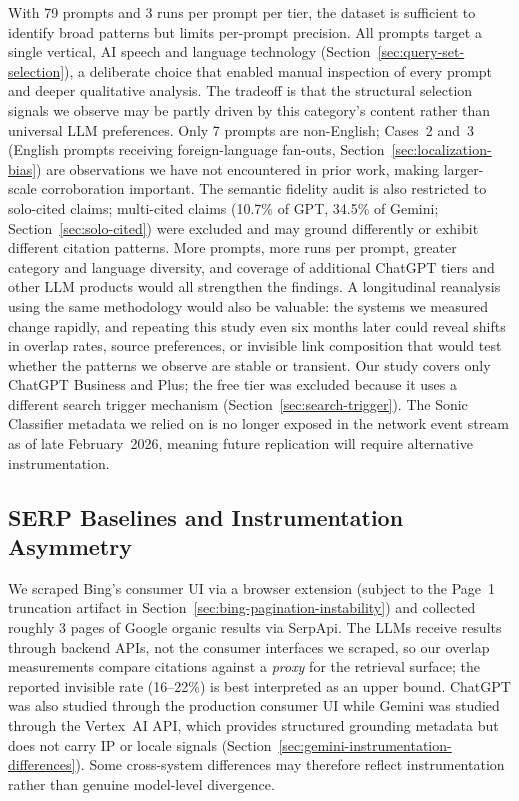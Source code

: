 With 79 prompts and 3 runs per prompt per tier, the dataset is sufficient to identify broad patterns but limits per-prompt precision. All prompts target a single vertical, AI speech and language technology (Section~\ref{sec:query-set-selection}), a deliberate choice that enabled manual inspection of every prompt and deeper qualitative analysis. The tradeoff is that the structural selection signals we observe may be partly driven by this category's content rather than universal LLM preferences. Only 7 prompts are non-English; Cases~2 and~3 (English prompts receiving foreign-language fan-outs, Section~\ref{sec:localization-bias}) are observations we have not encountered in prior work, making larger-scale corroboration important. The semantic fidelity audit is also restricted to solo-cited claims; multi-cited claims (10.7\% of GPT, 34.5\% of Gemini; Section~\ref{sec:solo-cited}) were excluded and may ground differently or exhibit different citation patterns. More prompts, more runs per prompt, greater category and language diversity, and coverage of additional ChatGPT tiers and other LLM products would all strengthen the findings. A longitudinal reanalysis using the same methodology would also be valuable: the systems we measured change rapidly, and repeating this study even six months later could reveal shifts in overlap rates, source preferences, or invisible link composition that would test whether the patterns we observe are stable or transient. Our study covers only ChatGPT Business and Plus; the free tier was excluded because it uses a different search trigger mechanism (Section~\ref{sec:search-trigger}). The Sonic Classifier metadata we relied on is no longer exposed in the network event stream as of late February~2026, meaning future replication will require alternative instrumentation.

\subsection{SERP Baselines and Instrumentation Asymmetry}
\label{sec:lim-serp}
\label{sec:lim-gemini}
\label{sec:lim-search-trigger}

We scraped Bing's consumer UI via a browser extension (subject to the Page~1 truncation artifact in Section~\ref{sec:bing-pagination-instability}) and collected roughly 3 pages of Google organic results via SerpApi. The LLMs receive results through backend APIs, not the consumer interfaces we scraped, so our overlap measurements compare citations against a \emph{proxy} for the retrieval surface; the reported invisible rate (16--22\%) is best interpreted as an upper bound. ChatGPT was also studied through the production consumer UI while Gemini was studied through the Vertex~AI API, which provides structured grounding metadata but does not carry IP or locale signals (Section~\ref{sec:gemini-instrumentation-differences}). Some cross-system differences may therefore reflect instrumentation rather than genuine model-level divergence.

